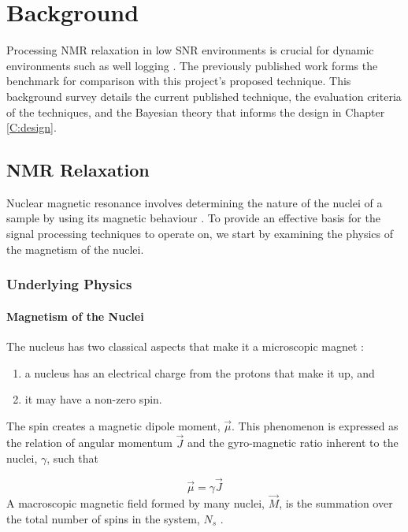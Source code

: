 \chapter{Background}\label{C:back}
Processing NMR relaxation in low SNR environments is crucial for dynamic environments such as well logging \cite{wellLoggingBook} \cite{UsingNMRPetrophysicalKenyon1992nuclear}. The previously published work forms the benchmark for comparison with this project's proposed technique. This background survey details the current published technique, the evaluation criteria of the techniques, and the Bayesian theory that informs the design in Chapter \ref{C:design}.

\section{NMR Relaxation}
Nuclear magnetic resonance involves determining the nature of the nuclei of a sample by using its magnetic behaviour \cite{NMRSignalProcessingBook}. To provide an effective basis for the signal processing techniques to operate on, we start by examining the physics of the magnetism of the nuclei.



\subsection{Underlying Physics}

\subsubsection{Magnetism of the Nuclei}
The nucleus has two classical aspects that make it a microscopic magnet \cite{NMRSignalProcessingBook}:
\begin{enumerate}
    \item a nucleus has an electrical charge from the protons that make it up, and
    \item it may have a non-zero spin.
\end{enumerate}
The spin creates a magnetic dipole moment, $\vec{\mu}$. This phenomenon is expressed as the relation of angular momentum $\vec{J}$ and the gyro-magnetic ratio inherent to the nuclei, $\gamma$, such that

\begin{equation}
    \vec{\mu} = \gamma \vec{J}
    \label{eq:magneticMomentEquation}
\end{equation}
A macroscopic magnetic field formed by many nuclei, $\vec{M}$, is the summation over the total number of spins in the system, $N_s$  \cite{NMRSignalProcessingBook}.

